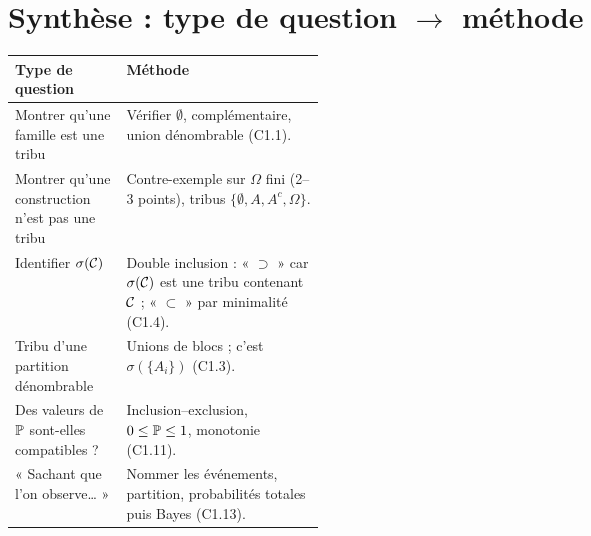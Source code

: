 \documentclass[11pt,a4paper]{article}
\begin{document}
\section*{Synthèse : type de question $\to$ méthode}
\renewcommand{\arraystretch}{1.3}
\begin{tabularx}{\linewidth}{@{}>{\raggedright\arraybackslash}p{0.36\linewidth}X@{}}
\toprule
Type de question & Méthode\\\midrule
Montrer qu'une famille est une tribu & Vérifier $\emptyset$, complémentaire, union dénombrable (C1.1).\\
Montrer qu'une construction n'est pas une tribu & Contre-exemple sur $\Omega$ fini (2--3 points), tribus $\{\emptyset,A,A^c,\Omega\}$.\\
Identifier $\sigma(\mathcal{C})$ & Double inclusion : « $\supset$ » car $\sigma(\mathcal{C})$ est une tribu contenant $\mathcal{C}$ ; « $\subset$ » par minimalité (C1.4).\\
Tribu d'une partition dénombrable & Unions de blocs ; c'est $\sigma(\{A_i\})$ (C1.3).\\
Des valeurs de $\mathbb{P}$ sont-elles compatibles ? & Inclusion--exclusion, $0\le\mathbb{P}\le1$, monotonie (C1.11).\\
« Sachant que l'on observe… » & Nommer les événements, partition, probabilités totales puis Bayes (C1.13).\\\bottomrule
\end{tabularx}
\end{document}
